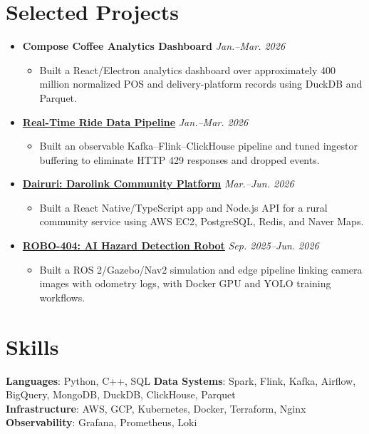 \documentclass[letterpaper,10pt]{article}
\newcommand{\resumeItemListStart}{\begin{itemize}[leftmargin=0.18in,itemsep=0pt,topsep=2pt]}
\newcommand{\resumeItemListEnd}{\end{itemize}\vspace{-5pt}}
\newcommand{\resumeSubHeadingListStart}{\begin{itemize}[leftmargin=0in,label={},itemsep=2pt,topsep=2pt]}
\newcommand{\resumeSubHeadingListEnd}{\end{itemize}}
\begin{document}
\section{Selected Projects}
\resumeSubHeadingListStart
  \item \textbf{Compose Coffee Analytics Dashboard} \hfill \textit{Jan.--Mar. 2026}
    \resumeItemListStart
      \item\small{Built a React/Electron analytics dashboard over approximately 400 million normalized POS and delivery-platform records using DuckDB and Parquet.}
    \resumeItemListEnd
  \item \textbf{\href{https://github.com/YBIGTA/27th-DE-WinterProject}{Real-Time Ride Data Pipeline}} \hfill \textit{Jan.--Mar. 2026}
    \resumeItemListStart
      \item\small{Built an observable Kafka--Flink--ClickHouse pipeline and tuned ingestor buffering to eliminate HTTP 429 responses and dropped events.}
    \resumeItemListEnd
  \item \textbf{\href{https://github.com/rammmaa/dairuri}{Dairuri: Darolink Community Platform}} \hfill \textit{Mar.--Jun. 2026}
    \resumeItemListStart
      \item\small{Built a React Native/TypeScript app and Node.js API for a rural community service using AWS EC2, PostgreSQL, Redis, and Naver Maps.}
    \resumeItemListEnd
  \item \textbf{\href{https://github.com/YBIGTA/27th-conference-robo404}{ROBO-404: AI Hazard Detection Robot}} \hfill \textit{Sep. 2025--Jun. 2026}
    \resumeItemListStart
      \item\small{Built a ROS 2/Gazebo/Nav2 simulation and edge pipeline linking camera images with odometry logs, with Docker GPU and YOLO training workflows.}
    \resumeItemListEnd
\resumeSubHeadingListEnd

\section{Skills}
\small{
\textbf{Languages}: Python, C++, SQL \quad
\textbf{Data Systems}: Spark, Flink, Kafka, Airflow, BigQuery, MongoDB, DuckDB, ClickHouse, Parquet \\
\textbf{Infrastructure}: AWS, GCP, Kubernetes, Docker, Terraform, Nginx \quad
\textbf{Observability}: Grafana, Prometheus, Loki
}
\end{document}

